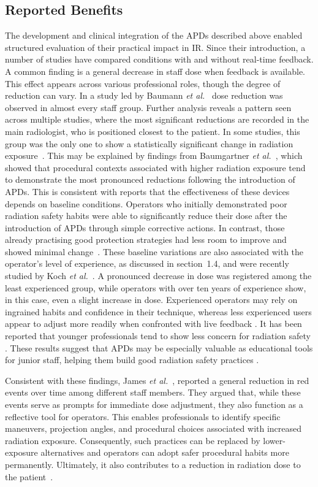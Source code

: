\subsection{Reported Benefits}
The development and clinical integration of the APDs described above enabled structured evaluation of their practical impact in IR. Since their introduction, a number of studies have compared conditions with and without real-time feedback. A common finding is a general decrease in staff dose when feedback is available. This effect appears across various professional roles, though the degree of reduction can vary. In a study led by Baumann \emph{et al.}~\cite{86} dose reduction was observed in almost every staff group. Further analysis reveals a pattern seen across multiple studies, where the most significant reductions are recorded in the main radiologist, who is positioned closest to the patient. In some studies, this group was the only one to show a statistically significant change in radiation exposure~\cite{72,86,87,88}. This may be explained by findings from Baumgartner \emph{et al.}\ \cite{72}, which showed that procedural contexts associated with higher radiation exposure tend to demonstrate the most pronounced reductions following the introduction of APDs. This is consistent with reports that the effectiveness of these devices depends on baseline conditions. Operators who initially demonstrated poor radiation safety habits were able to significantly reduce their dose after the introduction of APDs through simple corrective actions. In contrast, those already practising good protection strategies had less room to improve and showed minimal change~\cite{82,87,115}. These baseline variations are also associated with the operator’s level of experience, as discussed in section~1.4, and were recently studied by Koch \emph{et al.}~\cite{83}. A pronounced decrease in dose was registered among the least experienced group, while operators with over ten years of experience show, in this case, even a slight increase in dose. Experienced operators may rely on ingrained habits and confidence in their technique, whereas less experienced users appear to adjust more readily when confronted with live feedback \cite{83}. It has been reported that younger professionals tend to show less concern for radiation safety \cite{89}. These results suggest that APDs may be especially valuable as educational tools for junior staff, helping them build good radiation safety practices \cite{83}.

Consistent with these findings, James \emph{et al.}~\cite{115}, reported a general reduction in red events over time among different staff members. They argued that, while these events serve as prompts for immediate dose adjustment, they also function as a reflective tool for operators. This enables professionals to identify specific maneuvers, projection angles, and procedural choices associated with increased radiation exposure. Consequently, such practices can be replaced by lower-exposure alternatives and operators can adopt safer procedural habits more permanently. Ultimately, it also contributes to a reduction in radiation dose to the patient~\cite{115,116}.

